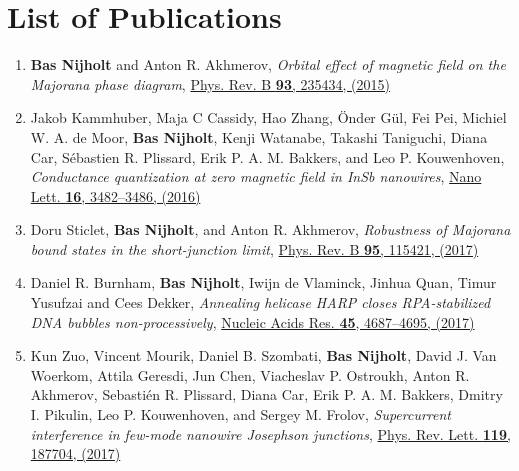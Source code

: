 \chapter*{List of Publications}
\label{publications}

\begin{enumerate}

\item \textbf{Bas Nijholt} and Anton R. Akhmerov, \textit{Orbital effect of magnetic field on the Majorana phase diagram}, \href{https://doi.org/10.1103/physrevb.93.235434}{Phys. Rev. B \textbf{93}, 235434, (2015)}

\item Jakob Kammhuber, Maja C Cassidy, Hao Zhang, {\"O}nder G{\"u}l, Fei Pei, Michiel W. A. de Moor, \textbf{Bas Nijholt}, Kenji Watanabe, Takashi Taniguchi, Diana Car, S{\'e}bastien R. Plissard, Erik P. A. M. Bakkers, and Leo P. Kouwenhoven, \textit{Conductance quantization at zero magnetic field in InSb nanowires}, \href{https://doi.org/10.1021/acs.nanolett.6b00051}{Nano Lett. \textbf{16}, 3482--3486, (2016)}

\item Doru Sticlet, \textbf{Bas Nijholt}, and Anton R. Akhmerov, \textit{Robustness of Majorana bound states in the short-junction limit}, \href{https://doi.org/10.1103/PhysRevB.95.115421}{Phys. Rev. B \textbf{95}, 115421, (2017)}

\item Daniel R. Burnham, \textbf{Bas Nijholt}, Iwijn de Vlaminck,  Jinhua Quan, Timur Yusufzai and Cees Dekker, \textit{Annealing helicase HARP closes RPA-stabilized DNA bubbles non-processively}, \href{https://doi.org/10.1093/nar/gkx147}{Nucleic Acids Res. \textbf{45}, 4687--4695, (2017)}

\item Kun Zuo, Vincent Mourik, Daniel B. Szombati, \textbf{Bas Nijholt}, David J. Van Woerkom, Attila Geresdi, Jun Chen, Viacheslav P. Ostroukh, Anton R. Akhmerov, Sebasti{\'e}n R. Plissard, Diana Car, Erik P. A. M. Bakkers, Dmitry I. Pikulin, Leo P. Kouwenhoven, and Sergey M. Frolov, \textit{Supercurrent interference in few-mode nanowire Josephson junctions}, \href{https://doi.org/10.1103/PhysRevLett.119.187704}{Phys. Rev. Lett. \textbf{119}, 187704, (2017)}


\end{enumerate}

